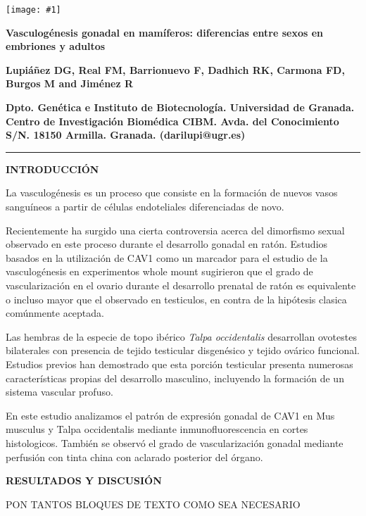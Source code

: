 \documentclass[a0,portrait]{a0poster}
\newcommand{\apartado}[1]{\noindent\fontsize{45pt}{45pt}\selectfont\textcolor[rgb]{0,0,1}{\textbf{\uppercase{#1}}}}
\newcommand{\texto}[1]{\fontsize{30pt}{30pt}\selectfont #1}
\newcommand{\textochico}[1]{\fontsize{12pt}{24pt}\selectfont #1}
\newcommand{\titulo}[4]%
{
 \begin{minipage}[c]{10cm}
 \texttt{[image: \#1]}
 \end{minipage}
 \hfill
 \begin{minipage}[c]{65cm}
 \fontsize{2.2cm}{2.6cm}\selectfont 
 \centering \textbf{\textcolor[rgb]{.5,0,0}{#2}}

 
 \vspace{.5cm}

 \begin{center}
 \fontsize{1.8cm}{1.8cm}\selectfont
 \textbf{\textcolor[rgb]{0,0,.5}{#3}}

 \vspace{.5cm}
 \fontsize{1.8cm}{1.8cm}\selectfont
 \textbf{\textcolor[rgb]{0,.5,0}{#4}}
 \end{center}
 \end{minipage}

 \vspace{1cm}
 
 \rule{\textwidth}{.2cm}
}
\begin{document}

\titulo{esc-ugr}{Vasculogénesis gonadal en mamíferos: diferencias entre sexos en embriones y adultos}{Lupiáñez DG, Real FM, Barrionuevo F, Dadhich RK, Carmona FD, Burgos M and Jiménez R}{Dpto. Genética e Instituto de Biotecnología. Universidad de Granada. Centro de Investigación Biomédica CIBM. Avda. del Conocimiento S/N. 18150 Armilla. Granada. (darilupi@ugr.es)}

\begin{multicols*}{2}

\apartado{Introducción}

\texto{
La vasculogénesis es un proceso que consiste en la formación de nuevos vasos sanguíneos a partir de células endoteliales diferenciadas de novo. 

Recientemente ha surgido una cierta controversia acerca del dimorfismo sexual observado en este proceso durante el desarrollo gonadal en ratón. Estudios basados en la utilización de CAV1 como un marcador para el estudio de la vasculogénesis en experimentos whole mount sugirieron que el grado de vascularización en el ovario durante el desarrollo prenatal de ratón es equivalente o incluso mayor que el observado en testiculos, en contra de la hipótesis clasica comúnmente aceptada. 

Las hembras de la especie de topo ibérico \emph{Talpa occidentalis} desarrollan ovotestes bilaterales con presencia de tejido testicular disgenésico y tejido ovárico funcional. Estudios previos han demostrado que esta porción testicular presenta numerosas características propias del desarrollo masculino, incluyendo la formación de un sistema vascular profuso.

En este estudio analizamos el patrón de expresión gonadal de CAV1 en Mus musculus y Talpa occidentalis mediante inmunofluorescencia en cortes histologicos. También se observó el grado de vascularización gonadal mediante perfusión con tinta china con aclarado posterior del órgano.


}









\apartado{Resultados y Discusión}

\textochico{
PON TANTOS BLOQUES DE TEXTO COMO SEA NECESARIO

}


\end{multicols*}
\end{document}
